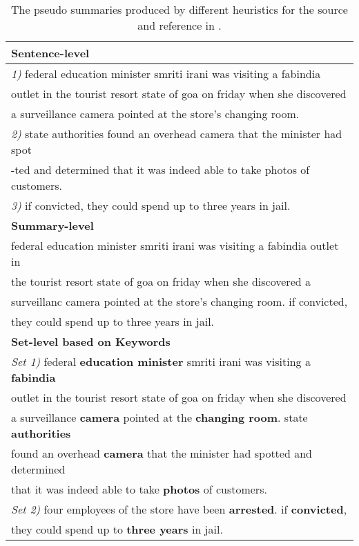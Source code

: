 \begin{table}[th]
	\begin{center}
		\small
		\begin{tabular}{|l|}%
			\hline \bf Sentence-level \\
			\hline \textit{1)} federal education minister smriti irani was visiting a fabindia \\
			outlet in the tourist resort state of goa on friday when she discovered \\
			a surveillance camera pointed at the store's changing room. \\ 
			\textit{2)} state authorities found an overhead camera that the minister had spot\\
			-ted and determined that it was indeed able to take photos of customers. \\
			\textit{3)} if convicted, they could spend up to three years in jail. \\
			\hline \bf Summary-level \\
			\hline federal education minister smriti irani was visiting a fabindia outlet in \\
			the tourist resort state of goa on friday when she discovered a \\
			surveillanc camera pointed at the store's changing room. if convicted,  \\
			they could spend up to three years in jail. \\
			\hline \bf Set-level based on Keywords\\
			\hline \textit{Set 1)} federal \textbf{education minister} smriti irani was visiting a \textbf{fabindia} \\
			outlet in the tourist resort state of goa on friday when she discovered \\
			a surveillance \textbf{camera} pointed at the \textbf{changing room}. state \textbf{authorities} \\ 
			found an overhead \textbf{camera} that the minister had spotted and determined \\
			that it was indeed able to take \textbf{photos} of customers. \\
			\textit{Set 2)} four employees of the store have been \textbf{arrested}. if \textbf{convicted}, \\
			they could spend up to \textbf{three years} in jail. \\
			\hline
		\end{tabular}
	\end{center}
	\caption{\label{tab:align_exp} The pseudo summaries produced by different heuristics for the source and reference in .}
\end{table}

